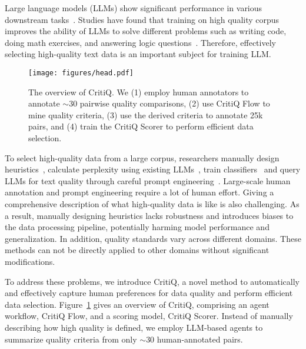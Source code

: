 Large language models (LLMs) show significant performance in various downstream
tasks~\citep{brown_language_2020,openai_gpt-4_2024,dubey_llama_2024}. Studies
have found that training on high quality corpus improves the ability of LLMs
to solve different problems such as writing code, doing math exercises, and
answering logic questions~\citep{cai_internlm2_2024,deepseek-ai_deepseek-v3_2024,qwen_qwen25_2024}.
Therefore, effectively selecting high-quality text data is an important subject for
training LLM.

\begin{figure}[t]
    \centering
    \texttt{[image: figures/head.pdf]}
    \caption{The overview of CritiQ. We (1) employ human annotators to annotate $\sim$30
    pairwise quality comparisons, (2) use CritiQ Flow to mine quality criteria, (3)
    use the derived criteria to annotate 25k pairs, and (4) train the CritiQ Scorer to
    perform efficient data selection.}
    \label{fig:overview}
\end{figure}

To select high-quality data from a large corpus, researchers manually design heuristics~\citep{dubey_llama_2024,rae_scaling_2022},
calculate perplexity using existing LLMs~\citep{marion2023moreinvestigatingdatapruning,wenzek2019ccnetextractinghighquality},
train classifiers~\citep{brown_language_2020,dubey_llama_2024,xie_data_2023} and
query LLMs for text quality through careful prompt engineering~\citep{gunasekar_textbooks_2023,wettig_qurating_2024,sachdeva_how_2024}.
Large-scale human annotation and prompt engineering require a lot of human
effort. Giving a comprehensive description of what high-quality data is like is also
challenging. As a result, manually designing heuristics lacks robustness and introduces
biases to the data processing pipeline, potentially harming model performance
and generalization. In addition, quality standards vary across different
domains. These methods can not be directly applied to other domains without significant
modifications.

To address these problems, we introduce CritiQ, a novel method to automatically
and effectively capture human preferences for data quality and perform efficient data
selection. Figure~\ref{fig:overview} gives an overview of CritiQ, comprising an agent
workflow, CritiQ Flow, and a scoring model, CritiQ Scorer. Instead of manually describing
how high quality is defined, we employ LLM-based agents to summarize quality
criteria from only $\sim$30 human-annotated pairs.

